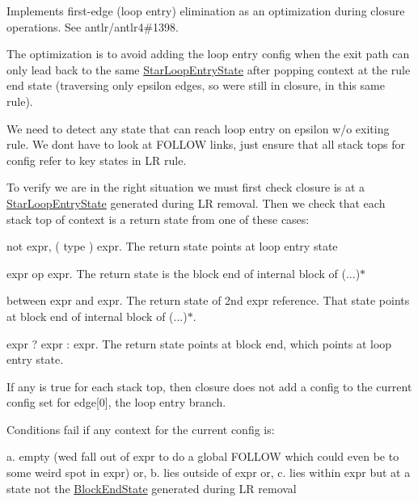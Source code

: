 Implements first-\/edge (loop entry) elimination as an optimization during closure operations. See antlr/antlr4\#1398.

The optimization is to avoid adding the loop entry config when the exit path can only lead back to the same \hyperlink{classantlr4_1_1atn_1_1StarLoopEntryState}{Star\+Loop\+Entry\+State} after popping context at the rule end state (traversing only epsilon edges, so we\textquotesingle{}re still in closure, in this same rule).

We need to detect any state that can reach loop entry on epsilon w/o exiting rule. We don\textquotesingle{}t have to look at F\+O\+L\+L\+OW links, just ensure that all stack tops for config refer to key states in LR rule.

To verify we are in the right situation we must first check closure is at a \hyperlink{classantlr4_1_1atn_1_1StarLoopEntryState}{Star\+Loop\+Entry\+State} generated during LR removal. Then we check that each stack top of context is a return state from one of these cases\+:


\begin{DoxyEnumerate}
\item \textquotesingle{}not\textquotesingle{} expr, \textquotesingle{}(\textquotesingle{} type \textquotesingle{})\textquotesingle{} expr. The return state points at loop entry state
\item expr op expr. The return state is the block end of internal block of (...)$\ast$
\item \textquotesingle{}between\textquotesingle{} expr \textquotesingle{}and\textquotesingle{} expr. The return state of 2nd expr reference. That state points at block end of internal block of (...)$\ast$.
\item expr \textquotesingle{}?\textquotesingle{} expr \textquotesingle{}\+:\textquotesingle{} expr. The return state points at block end, which points at loop entry state.
\end{DoxyEnumerate}

If any is true for each stack top, then closure does not add a config to the current config set for edge\mbox{[}0\mbox{]}, the loop entry branch.

Conditions fail if any context for the current config is\+:

a. empty (we\textquotesingle{}d fall out of expr to do a global F\+O\+L\+L\+OW which could even be to some weird spot in expr) or, b. lies outside of expr or, c. lies within expr but at a state not the \hyperlink{classantlr4_1_1atn_1_1BlockEndState}{Block\+End\+State} generated during LR removal

